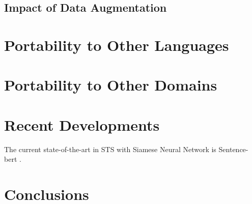 	
\subsection{Impact of Data Augmentation}	


\section{Portability to Other Languages}

\section{Portability to Other Domains}

\section{Recent Developments}
The current state-of-the-art in STS with Siamese Neural Network is Sentence-bert \cite{reimers-gurevych-2019-sentence}.

\section{Conclusions}